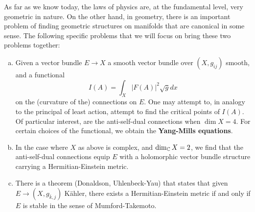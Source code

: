 \documentclass{../mathnotes}
\begin{document}
As far as we know today, the laws of physics are, at the fundamental level, very geometric in nature.
On the other hand, in geometry, there is an important problem of finding geometric structures on manifolds
that are canonical in some sense. The following specific problems that we will focus on bring these
two problems together:
\begin{enumerate}[(a)]
    \item Given a vector bundle $E\to X$ a smooth vector bundle over $(X,g_{ij})$ smooth, and a functional
        \[I(A)=\int_X |F(A)|^2\sqrt{g}dx\]
        on the (curvature of the) connections on $E$. One may attempt to, in analogy to the principal of least action,
        attempt to find the critical points of $I(A)$. Of particular interest, are the anti-self-dual connections
        when $\dim X=4$. For certain choices of the functional, we obtain the \textbf{Yang-Mills equations}.
    \item In the case where $X$ as above is complex, and $\dim_{\mathbb{C}} X=2$, we find that the anti-self-dual connections
        equip $E$ with a holomorphic vector bundle structure carrying a Hermitian-Einstein metric.
    \item There is a theorem (Donaldson, Uhlenbeck-Yau) that states that given $E\to (X,g_{\bar k,j})$ K\"ahler,
        there exists a Hermitian-Einstein metric if and only if $E$ is stable in the sense of Mumford-Takemoto.
\end{enumerate}
\end{document}
